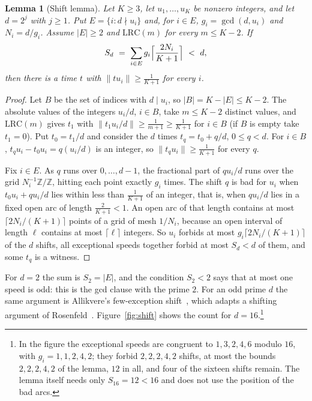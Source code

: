 \documentclass[aps,prd,twocolumn,superscriptaddress,nofootinbib,longbibliography,floatfix,showkeys,amsmath,amssymb,10pt]{revtex4-2}
\newtheorem{lemma}[theorem]{Lemma}
\theoremstyle{definition}
\theoremstyle{remark}
\newcommand{\Z}{\mathbb{Z}}
\newcommand{\LRC}{\mathrm{LRC}}
\begin{document}
\begin{lemma}[Shift lemma]\label{lem:shift}
Let $K\ge3$, let $u_1,\dots,u_K$ be nonzero integers, and let $d=2^j$ with
$j\ge1$. Put $E=\{i:d\nmid u_i\}$ and, for $i\in E$, $g_i=\gcd(d,u_i)$ and
$N_i=d/g_i$. Assume $|E|\ge2$ and $\LRC(m)$ for every $m\le K-2$. If
\begin{equation}\label{eq:Sd}
 S_d\ =\ \sum_{i\in E}g_i\Bigl\lceil\frac{2N_i}{K+1}\Bigr\rceil\ <\ d,
\end{equation}
then there is a time $t$ with $\|tu_i\|\ge\frac1{K+1}$ for every $i$.
\end{lemma}

\begin{proof}
Let $B$ be the set of indices with $d\mid u_i$, so $|B|=K-|E|\le K-2$. The
absolute values of the integers $u_i/d$, $i\in B$, take $m\le K-2$ distinct
values, and $\LRC(m)$ gives $t_1$ with $\|t_1u_i/d\|\ge\frac1{m+1}\ge
\frac1{K+1}$ for $i\in B$ (if $B$ is empty take $t_1=0$). Put $t_0=t_1/d$
and consider the $d$ times $t_q=t_0+q/d$, $0\le q<d$. For $i\in B$,
$t_qu_i-t_0u_i=q(u_i/d)$ is an integer, so $\|t_qu_i\|\ge\frac1{K+1}$ for
every $q$.

Fix $i\in E$. As $q$ runs over $0,\dots,d-1$, the fractional part of
$qu_i/d$ runs over the grid $N_i^{-1}\Z/\Z$, hitting each point exactly
$g_i$ times. The shift $q$ is bad for $u_i$ when $t_0u_i+qu_i/d$ lies within
less than $\frac1{K+1}$ of an integer, that is, when $qu_i/d$ lies in a
fixed open arc of length $\frac2{K+1}<1$. An open arc of that length
contains at most $\lceil2N_i/(K+1)\rceil$ points of a grid of mesh $1/N_i$,
because an open interval of length $\ell$ contains at most $\lceil\ell\rceil$
integers. So $u_i$ forbids at most $g_i\lceil2N_i/(K+1)\rceil$ of the $d$
shifts, all exceptional speeds together forbid at most $S_d<d$ of them, and
some $t_q$ is a witness.
\end{proof}

For $d=2$ the sum is $S_2=|E|$, and the condition $S_2<2$ says that at most
one speed is odd: this is the gcd clause with the prime $2$. For an odd
prime $d$ the same argument is Allikvere's few-exception
shift~\cite[Lemma~4.6]{All26}, which adapts a shifting argument of
Rosenfeld~\cite[Lemma~5]{Ros26b}. Figure~\ref{fig:shift} shows the count for
$d=16$.\footnote{In the figure the exceptional speeds are congruent to
$1,3,2,4,6$ modulo $16$, with $g_i=1,1,2,4,2$; they forbid $2,2,2,4,2$ shifts,
at most the bounds $2,2,2,4,2$ of the lemma, $12$ in all, and four of the
sixteen shifts remain. The lemma itself needs only $S_{16}=12<16$ and does
not use the position of the bad arcs.}
\end{document}
